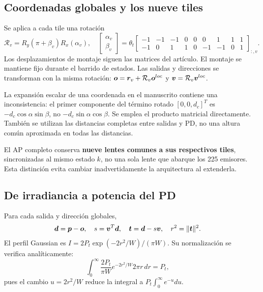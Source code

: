 \subsection{Coordenadas globales y los nueve tiles}
Se aplica a cada tile una rotación
\begin{equation}
\mathcal R_v=R_y(\pi+\beta_v)R_x(\alpha_v),
\quad
\begin{bmatrix}\alpha_v\\\beta_v\end{bmatrix}
=\theta_t\begin{bmatrix}-1&-1&-1&0&0&0&1&1&1\\-1&0&1&1&0&-1&-1&0&1\end{bmatrix}_{:,v}.
\end{equation}
Los desplazamientos de montaje siguen las matrices del artículo. El montaje se mantiene fijo durante el barrido de estados. Las salidas y direcciones se transforman con la misma rotación: $\bm{o}=\bm{r}_v+\mathcal R_v\bm{o}^{loc}$ y $\bm{v}=\mathcal R_v\bm{v}^{loc}$.

La expansión escalar de una coordenada en el manuscrito contiene una inconsistencia: el primer componente del término rotado $[0,0,d_c]^T$ es $-d_c\cos\alpha\sin\beta$, no $-d_c\sin\alpha\cos\beta$. Se emplea el producto matricial directamente. También se utilizan las distancias completas entre salidas y PD, no una altura común aproximada en todas las distancias.

El AP completo conserva \textbf{nueve lentes comunes a sus respectivos tiles}, sincronizadas al mismo estado $k$, no una sola lente que abarque los 225 emisores. Esta distinción evita cambiar inadvertidamente la arquitectura al extenderla.

\subsection{De irradiancia a potencia del PD}
Para cada salida y dirección globales,
\begin{equation}
\bm{d}=\bm{p}-\bm{o},\quad s=\bm{v}^T\bm{d},\quad
\bm{t}=\bm{d}-s\bm{v},\quad r^2=\|\bm{t}\|^2.
\end{equation}
El perfil Gaussian es $I=2P_t\exp(-2r^2/W)/(\pi W)$. Su normalización se verifica analíticamente:
\begin{equation}
\int_0^\infty\frac{2P_t}{\pi W}e^{-2r^2/W}2\pi r\,dr=P_t,
\end{equation}
pues el cambio $u=2r^2/W$ reduce la integral a $P_t\int_0^\infty e^{-u}du$.

